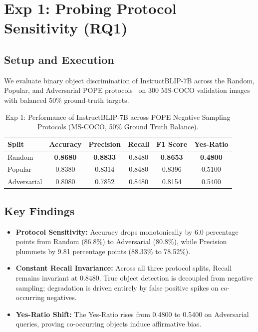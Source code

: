 \documentclass[conference]{IEEEtran}
\begin{document}
\section{Exp 1: Probing Protocol Sensitivity (RQ1)}

\subsection{Setup and Execution}
We evaluate binary object discrimination of InstructBLIP-7B across the Random, Popular, and Adversarial POPE protocols~\cite{li2023evaluating} on 300 MS-COCO validation images with balanced 50\% ground-truth targets.

\begin{table}[htbp]
\caption{Exp 1: Performance of InstructBLIP-7B across POPE Negative Sampling Protocols (MS-COCO, 50\% Ground Truth Balance).}
\label{tab:exp1_pope}
\centering
\begin{tabular}{lccccc}
\toprule
\textbf{Split} & \textbf{Accuracy} & \textbf{Precision} & \textbf{Recall} & \textbf{F1 Score} & \textbf{Yes-Ratio} \\
\midrule
Random      & \textbf{0.8680} & \textbf{0.8833} & 0.8480 & \textbf{0.8653} & \textbf{0.4800} \\
Popular     & 0.8380          & 0.8314          & 0.8480 & 0.8396          & 0.5100 \\
Adversarial & 0.8080          & 0.7852          & 0.8480 & 0.8154          & 0.5400 \\
\bottomrule
\end{tabular}
\end{table}

\subsection{Key Findings}
\begin{itemize}
    \item \textbf{Protocol Sensitivity:} Accuracy drops monotonically by 6.0 percentage points from Random (86.8\%) to Adversarial (80.8\%), while Precision plummets by 9.81 percentage points (88.33\% to 78.52\%).
    \item \textbf{Constant Recall Invariance:} Across all three protocol splits, Recall remains invariant at $0.8480$. True object detection is decoupled from negative sampling; degradation is driven entirely by false positive spikes on co-occurring negatives.
    \item \textbf{Yes-Ratio Shift:} The Yes-Ratio rises from 0.4800 to 0.5400 on Adversarial queries, proving co-occurring objects induce affirmative bias.
\end{itemize}
\end{document}
